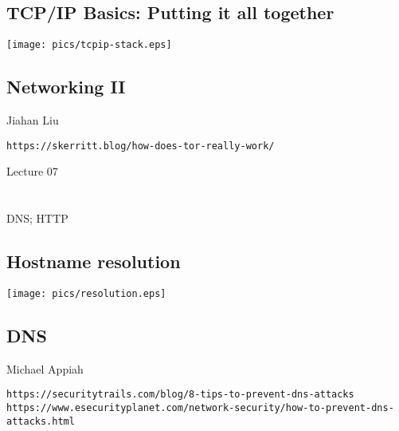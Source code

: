 \documentclass[xga]{xdvislides}
\begin{document}
\subsection{TCP/IP Basics: Putting it all together}
\vspace*{\fill}
\begin{center}
	\texttt{[image: pics/tcpip-stack.eps]}
\end{center}
\vspace*{\fill}

\subsection{Networking II}
Jiahan Liu\\
\vspace{1in}

\verb+https://skerritt.blog/how-does-tor-really-work/+

\newpage
\vspace*{\fill}
\begin{center}
    \Hugesize
        Lecture 07 \\ [1em]
    \hspace*{5mm}
    \blueline\\
    \hspace*{5mm}\\
	DNS; HTTP
\end{center}
\vspace*{\fill}

\subsection{Hostname resolution}
\vspace*{\fill}
\begin{center}
	\texttt{[image: pics/resolution.eps]}
\end{center}
\vspace*{\fill}

\subsection{DNS}
Michael Appiah\\
\vspace{1in}

\verb+https://securitytrails.com/blog/8-tips-to-prevent-dns-attacks+ \\
\verb+https://www.esecurityplanet.com/network-security/how-to-prevent-dns-attacks.html+
\end{document}
